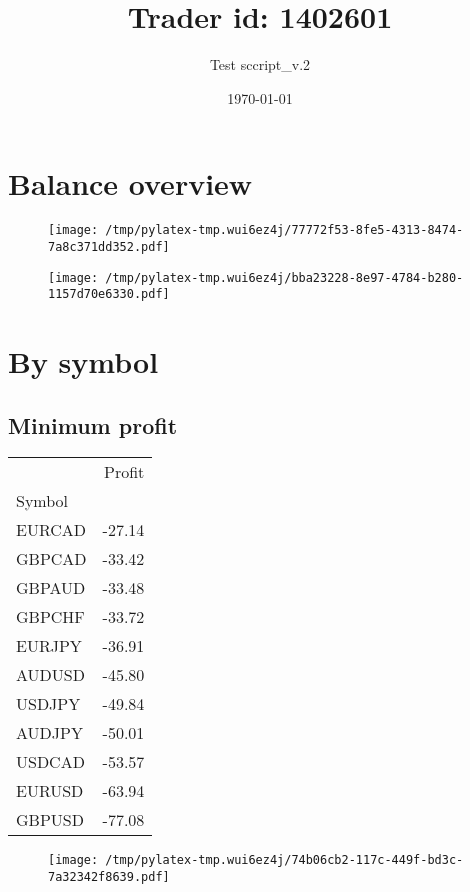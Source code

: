 \documentclass{article}%
\title{Trader id: 1402601}%
\author{Test sccript\_v.2}%
\date{\today}%
\begin{document}
%
\normalsize%
\maketitle%
\section{Balance overview}%
\label{sec:Balanceoverview}%


\begin{figure}[htbp]%
\centering%
\texttt{[image: /tmp/pylatex-tmp.wui6ez4j/77772f53-8fe5-4313-8474-7a8c371dd352.pdf]}%
\end{figure}

%


\begin{figure}[htbp]%
\centering%
\texttt{[image: /tmp/pylatex-tmp.wui6ez4j/bba23228-8e97-4784-b280-1157d70e6330.pdf]}%
\end{figure}

%
\section{By symbol}%
\label{sec:Bysymbol}%
\subsection{Minimum profit }%
\label{subsec:Minimumprofit}%
\begin{tabular}{lr}
\toprule
{} &  Profit \\
Symbol &         \\
\midrule
EURCAD &  -27.14 \\
GBPCAD &  -33.42 \\
GBPAUD &  -33.48 \\
GBPCHF &  -33.72 \\
EURJPY &  -36.91 \\
AUDUSD &  -45.80 \\
USDJPY &  -49.84 \\
AUDJPY &  -50.01 \\
USDCAD &  -53.57 \\
EURUSD &  -63.94 \\
GBPUSD &  -77.08 \\
\bottomrule
\end{tabular}
%


\begin{figure}[htbp]%
\centering%
\texttt{[image: /tmp/pylatex-tmp.wui6ez4j/74b06cb2-117c-449f-bd3c-7a32342f8639.pdf]}%
\end{figure}
\end{document}
